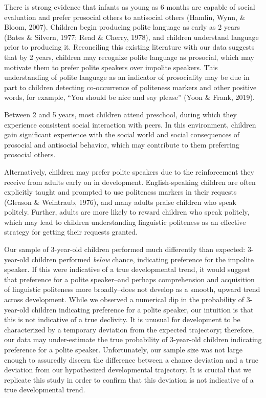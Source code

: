 \documentclass[
  english,
  man,floatsintext]{apa6}
\begin{document}
There is strong evidence that infants as young as 6 months are capable of social evaluation and prefer prosocial others to antisocial others (Hamlin, Wynn, \& Bloom, 2007). Children begin producing polite language as early as 2 years (Bates \& Silvern, 1977; Read \& Cherry, 1978), and children understand language prior to producing it. Reconciling this existing literature with our data suggests that by 2 years, children may recognize polite language as prosocial, which may motivate them to prefer polite speakers over impolite speakers. This understanding of polite language as an indicator of prosociality may be due in part to children detecting co-occurrence of politeness markers and other positive words, for example, ``You should be nice and say please'' (Yoon \& Frank, 2019).

Between 2 and 5 years, most children attend preschool, during which they experience consistent social interaction with peers. In this environment, children gain significant experience with the social world and social consequences of prosocial and antisocial behavior, which may contribute to them preferring prosocial others.

Alternatively, children may prefer polite speakers due to the reinforcement they receive from adults early on in development. English-speaking children are often explicitly taught and prompted to use politeness markers in their requests (Gleason \& Weintraub, 1976), and many adults praise children who speak politely. Further, adults are more likely to reward children who speak politely, which may lead to children understanding linguistic politeness as an effective strategy for getting their requests granted.

Our sample of 3-year-old children performed much differently than expected: 3-year-old children performed \emph{below} chance, indicating preference for the impolite speaker. If this were indicative of a true developmental trend, it would suggest that preference for a polite speaker--and perhaps comprehension and acquisition of linguistic politeness more broadly--does not develop as a smooth, upward trend across development. While we observed a numerical dip in the probability of 3-year-old children indicating preference for a polite speaker, our intuition is that this is not indicative of a true declivity. It is unusual for development to be characterized by a temporary deviation from the expected trajectory; therefore, our data may under-estimate the true probability of 3-year-old children indicating preference for a polite speaker. Unfortunately, our sample size was not large enough to assuredly discern the difference between a chance deviation and a true deviation from our hypothesized developmental trajectory. It is crucial that we replicate this study in order to confirm that this deviation is not indicative of a true developmental trend.
\end{document}

